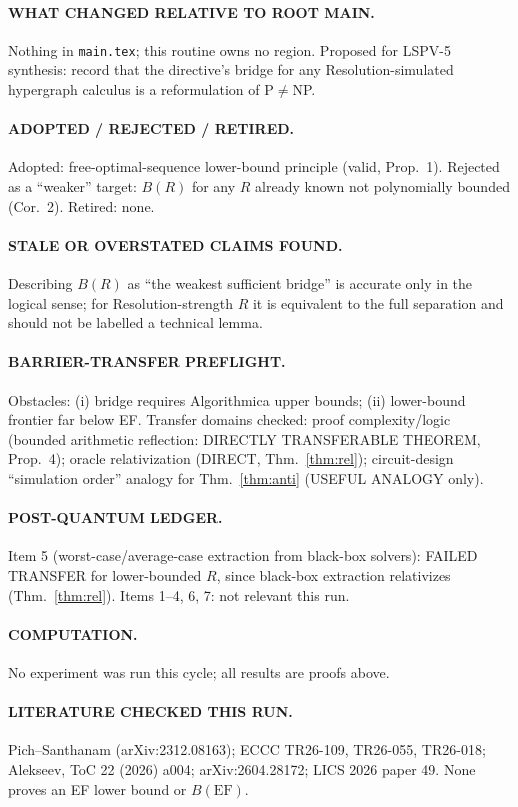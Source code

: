 \documentclass[11pt]{article}
\theoremstyle{definition}
\theoremstyle{remark}
\begin{document}
\paragraph{WHAT CHANGED RELATIVE TO ROOT MAIN.} Nothing in \texttt{main.tex}; this routine owns no region. Proposed for LSPV-5
synthesis: record that the directive's bridge for any Resolution-simulated hypergraph calculus is a reformulation of P$\ne$NP.
\paragraph{ADOPTED / REJECTED / RETIRED.} Adopted: free-optimal-sequence lower-bound principle (valid, Prop.~1).
Rejected as a ``weaker'' target: $B(R)$ for any $R$ already known not polynomially bounded (Cor.~2). Retired: none.
\paragraph{STALE OR OVERSTATED CLAIMS FOUND.} Describing $B(R)$ as ``the weakest sufficient bridge'' is accurate only in the
logical sense; for Resolution-strength $R$ it is equivalent to the full separation and should not be labelled a technical lemma.
\paragraph{BARRIER-TRANSFER PREFLIGHT.} Obstacles: (i) bridge requires Algorithmica upper bounds; (ii) lower-bound frontier
far below EF. Transfer domains checked: proof complexity/logic (bounded arithmetic reflection: DIRECTLY TRANSFERABLE THEOREM,
Prop.~4); oracle relativization (DIRECT, Thm.~\ref{thm:rel}); circuit-design ``simulation order'' analogy for Thm.~\ref{thm:anti}
(USEFUL ANALOGY only).
\paragraph{POST-QUANTUM LEDGER.} Item 5 (worst-case/average-case extraction from black-box solvers): FAILED TRANSFER for
lower-bounded $R$, since black-box extraction relativizes (Thm.~\ref{thm:rel}). Items 1--4, 6, 7: not relevant this run.
\paragraph{COMPUTATION.} No experiment was run this cycle; all results are proofs above.
\paragraph{LITERATURE CHECKED THIS RUN.} Pich--Santhanam (arXiv:2312.08163); ECCC TR26-109, TR26-055, TR26-018;
Alekseev, ToC 22 (2026) a004; arXiv:2604.28172; LICS 2026 paper 49. None proves an EF lower bound or $B(\mathrm{EF})$.
\end{document}
